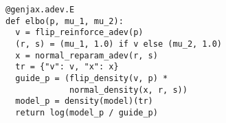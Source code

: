 \documentclass{article}
\begin{document}
\begin{verbatim}
@genjax.adev.E
def elbo(p, mu_1, mu_2):
  v = flip_reinforce_adev(p)
  (r, s) = (mu_1, 1.0) if v else (mu_2, 1.0)
  x = normal_reparam_adev(r, s)
  tr = {"v": v, "x": x}
  guide_p = (flip_density(v, p) * 
             normal_density(x, r, s))
  model_p = density(model)(tr)
  return log(model_p / guide_p)
\end{verbatim}
\end{document}
